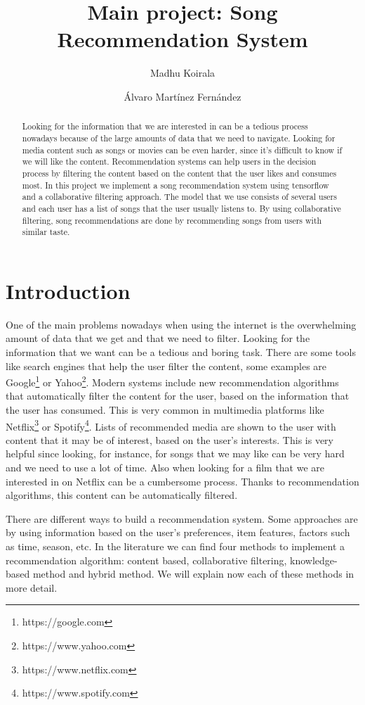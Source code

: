 \documentclass{jot}
\title{Main project: Song Recommendation System}
\author[affiliation=UiT, nowrap]
    {Madhu Koirala}
    {is a master student in Computer Science at the University of Troms\o. You can contact him at \email{mko075@uit.no}.}
\author[affiliation=UiT, nowrap]
    {\'{A}lvaro Mart\'{i}nez Fern\'{a}ndez}
    { is a master student in Computer Science at the University of Troms\o. You can contact him at \email{afe026@uit.no}.}
\affiliation{UiT}{University of Troms\o, Norway\\
\url{https://uit.no/startsida}}
\begin{document}
\begin{abstract}
Looking for the information that we are interested in can be a tedious process nowadays because of the large amounts of data that we need to navigate. Looking for media content such as songs or movies can be even harder, since it’s difficult to know if we will like the content. Recommendation systems can help users in the decision process by filtering the content based on the content that the user likes and consumes most. In this project we implement a song recommendation system using tensorflow and a collaborative filtering approach. The model that we use consists of several users and each user has a list of songs that the user usually listens to. By using collaborative filtering, song recommendations are done by recommending songs from users with similar taste.
\end{abstract}


\tableofcontents

\section{Introduction}
One of the main problems nowadays when using the internet is the overwhelming amount of data that we get and that we need to filter. Looking for the information that we want can be a tedious and boring task. There are some tools like search engines that help the user filter the content, some examples are Google\footnote{https://google.com} or Yahoo\footnote{https://www.yahoo.com}. Modern systems include new recommendation algorithms that automatically filter the content for the user, based on the information that the user has consumed. This is very common in multimedia platforms like Netflix\footnote{https://www.netflix.com} or Spotify\footnote{https://www.spotify.com}. Lists of recommended media are shown to the user with content that it may be of interest, based on the user’s interests. This is very helpful since looking, for instance, for songs that we may like can be very hard and we need to use a lot of time. Also when looking for a film that we are interested in on Netflix can be a cumbersome process. Thanks to recommendation algorithms, this content can be automatically filtered.

There are different ways to build a recommendation system. Some approaches are by using information based on the user’s preferences, item features, factors such as time, season, etc. In the literature we can find four methods to implement a recommendation algorithm: content based, collaborative filtering, knowledge-based method and hybrid method. We will explain now each of these methods in more detail.
\end{document}

